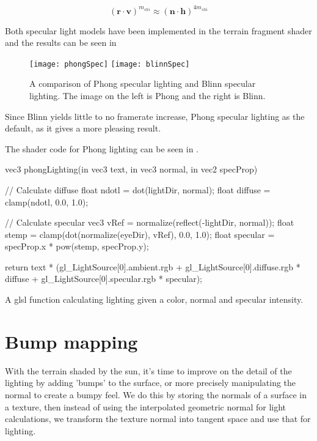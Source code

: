 
\begin{displaymath}
  (\mathbf{r} \cdot \mathbf{v})^{m_{shi}} \approx (\mathbf{n} \cdot \mathbf{h})^{4m_{shi}} 
\end{displaymath}

Both specular light models have been implemented in the terrain
fragment shader and the results can be seen in 

\begin{figure}
  \label{fig:specularLight}
  \centering
  \texttt{[image: phongSpec]}
  \texttt{[image: blinnSpec]}
  \caption{A comparison of Phong specular lighting and Blinn specular lighting. The image on the left is Phong and the right is Blinn.}
\end{figure}

Since Blinn yields little to no framerate increase, Phong specular
lighting as the default, as it gives a more pleasing result.

The shader code for Phong lighting can be seen in
.

\begin{listing}
\label{lst:phongLighting}
\centering
\begin{cppcode}
vec3 phongLighting(in vec3 text, in vec3 normal, in vec2 specProp){
  // Calculate diffuse
  float ndotl = dot(lightDir, normal);
  float diffuse = clamp(ndotl, 0.0, 1.0);
  
  // Calculate specular
  vec3 vRef = normalize(reflect(-lightDir, normal));
  float stemp = clamp(dot(normalize(eyeDir), vRef), 0.0, 1.0);
  float specular = specProp.x * pow(stemp, specProp.y);
  
  return text * (gl_LightSource[0].ambient.rgb + 
                 gl_LightSource[0].diffuse.rgb * diffuse + 
                 gl_LightSource[0].specular.rgb * specular);
}
\end{cppcode}
\caption{A glsl function calculating lighting given a color, normal and specular intensity.}
\end{listing}


\section{Bump mapping}

With the terrain shaded by the sun, it's time to improve on the detail
of the lighting by adding 'bumps' to the surface, or more precisely
manipulating the normal to create a bumpy feel. We do this by storing
the normals of a surface in a texture, then instead of using the
interpolated geometric normal for light calculations, we transform the
texture normal into tangent space and use that for lighting.

